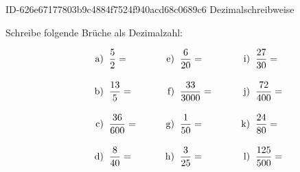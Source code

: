 \begin{exercise}
      {ID-626e67177803b9c4884f7524f940acd68c0689c6}
      {Dezimalschreibweise}
  \ifproblem\problem\par
    Schreibe folgende Brüche als Dezimalzahl:
    \newcommand{\no}[1]
    {%
      \vphantom{\Bigg(}%
      \makebox[3em][r]%
      {%
        #1)%
      }%
      \;\;&%
    }%
    \begin{align*}
      \no{a} \frac{5}{2}=    & \no{e} \frac{6}{20}=    & \no{i} \frac{27}{30}=  \\
      \no{b} \frac{13}{5}=   & \no{f} \frac{33}{3000}= & \no{j} \frac{72}{400}= \\
      \no{c} \frac{36}{600}= & \no{g} \frac{1}{50}=    & \no{k} \frac{24}{80}=  \\
      \no{d} \frac{8}{40}=   & \no{h} \frac{3}{25}=    & \no{l} \frac{125}{500}=
    \end{align*}
  \fi
\end{exercise}
